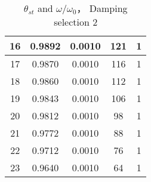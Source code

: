 \begin{table}[H]
\begin{tabular}{|c|c|c|c|c|}
                16 & 0.9892 & 0.0010 & 121 & 1\\\hline
                17 & 0.9870 & 0.0010 & 116 & 1\\\hline
                18 & 0.9860 & 0.0010 & 112 & 1\\\hline
                19 & 0.9843 & 0.0010 & 106 & 1\\\hline
                20 & 0.9812 & 0.0010 & 98 & 1\\\hline
                21 & 0.9772 & 0.0010 & 88 & 1\\\hline
                22 & 0.9712 & 0.0010 & 76 & 1\\\hline
                23 & 0.9640 & 0.0010 & 64 & 1\\\hline
            \end{tabular}
            \caption{$\theta_{st}$ and $\omega/\omega_0$， Damping selection 2}\label{data_theta2}
        \end{table}

